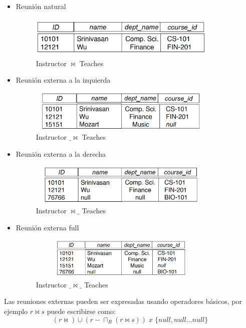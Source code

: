 \documentclass[12pt,a4paper]{report}
\begin{document}
		\begin{itemize}
			\item Reunión natural
			\begin{figure}[htb]
				\centering
				\includegraphics[width=9cm, height=2cm]{./imagenes/nj.png}
				\caption{Instructor $\bowtie$ Teaches}
			\end{figure}
			\item Reunión externa a la izquierda
			\begin{figure}[htb]
				\centering
				\includegraphics[width=9cm, height=2cm]{./imagenes/izquierda.png}
				\caption{Instructor $\_\bowtie$ Teaches}
			\end{figure}
			\item Reunión externa a la derecha
			\begin{figure}[htb]
				\centering
				\includegraphics[width=9cm, height=2cm]{./imagenes/derecha.png}
				\caption{Instructor $\bowtie\_$ Teaches}
			\end{figure}
			\item Reunión externa full
			\begin{figure}[htb]
				\centering
				\includegraphics[width=9cm, height=2cm]{./imagenes/full.png}
				\caption{Instructor $\_\bowtie\_$ Teaches}
			\end{figure}
		\end{itemize}
		
		\par Las reuniones externas pueden ser expresadas usando operadores básicos, por ejemplo $r \bowtie s$ puede escribirse como:
		\[ (r \bowtie) \cup (r - \sqcap_{R}(r \bowtie s)) \; x \; \lbrace null, null \dotsc null 	 \rbrace\]
	
\end{document}
